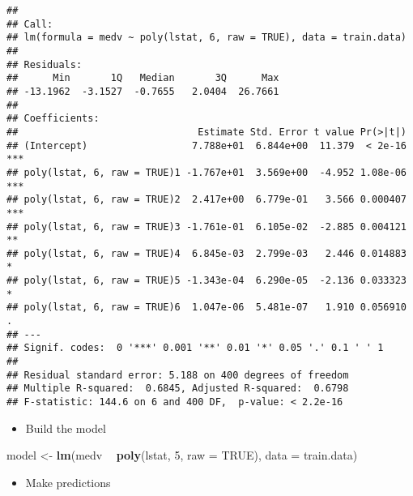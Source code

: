\documentclass[
]{article}
\newenvironment{Shaded}{\begin{snugshade}}{\end{snugshade}}
\newcommand{\DataTypeTok}[1]{\textcolor[rgb]{0.13,0.29,0.53}{#1}}
\newcommand{\DecValTok}[1]{\textcolor[rgb]{0.00,0.00,0.81}{#1}}
\newcommand{\KeywordTok}[1]{\textcolor[rgb]{0.13,0.29,0.53}{\textbf{#1}}}
\newcommand{\NormalTok}[1]{#1}
\newcommand{\OperatorTok}[1]{\textcolor[rgb]{0.81,0.36,0.00}{\textbf{#1}}}
\newcommand{\OtherTok}[1]{\textcolor[rgb]{0.56,0.35,0.01}{#1}}
\newcommand{\StringTok}[1]{\textcolor[rgb]{0.31,0.60,0.02}{#1}}
\providecommand{\tightlist}{%
  \setlength{\itemsep}{0pt}\setlength{\parskip}{0pt}}
\begin{document}
\begin{verbatim}
## 
## Call:
## lm(formula = medv ~ poly(lstat, 6, raw = TRUE), data = train.data)
## 
## Residuals:
##      Min       1Q   Median       3Q      Max 
## -13.1962  -3.1527  -0.7655   2.0404  26.7661 
## 
## Coefficients:
##                               Estimate Std. Error t value Pr(>|t|)    
## (Intercept)                  7.788e+01  6.844e+00  11.379  < 2e-16 ***
## poly(lstat, 6, raw = TRUE)1 -1.767e+01  3.569e+00  -4.952 1.08e-06 ***
## poly(lstat, 6, raw = TRUE)2  2.417e+00  6.779e-01   3.566 0.000407 ***
## poly(lstat, 6, raw = TRUE)3 -1.761e-01  6.105e-02  -2.885 0.004121 ** 
## poly(lstat, 6, raw = TRUE)4  6.845e-03  2.799e-03   2.446 0.014883 *  
## poly(lstat, 6, raw = TRUE)5 -1.343e-04  6.290e-05  -2.136 0.033323 *  
## poly(lstat, 6, raw = TRUE)6  1.047e-06  5.481e-07   1.910 0.056910 .  
## ---
## Signif. codes:  0 '***' 0.001 '**' 0.01 '*' 0.05 '.' 0.1 ' ' 1
## 
## Residual standard error: 5.188 on 400 degrees of freedom
## Multiple R-squared:  0.6845, Adjusted R-squared:  0.6798 
## F-statistic: 144.6 on 6 and 400 DF,  p-value: < 2.2e-16
\end{verbatim}

\begin{itemize}
\tightlist
\item
  Build the model
\end{itemize}

\begin{Shaded}
\begin{Highlighting}[]
\NormalTok{model <-}\StringTok{ }\KeywordTok{lm}\NormalTok{(medv }\OperatorTok{~}\StringTok{ }\KeywordTok{poly}\NormalTok{(lstat, }\DecValTok{5}\NormalTok{, }\DataTypeTok{raw =} \OtherTok{TRUE}\NormalTok{), }\DataTypeTok{data =}\NormalTok{ train.data)}
\end{Highlighting}
\end{Shaded}

\begin{itemize}
\tightlist
\item
  Make predictions
\end{itemize}

\begin{Shaded}
\end{Shaded}
\end{document}
